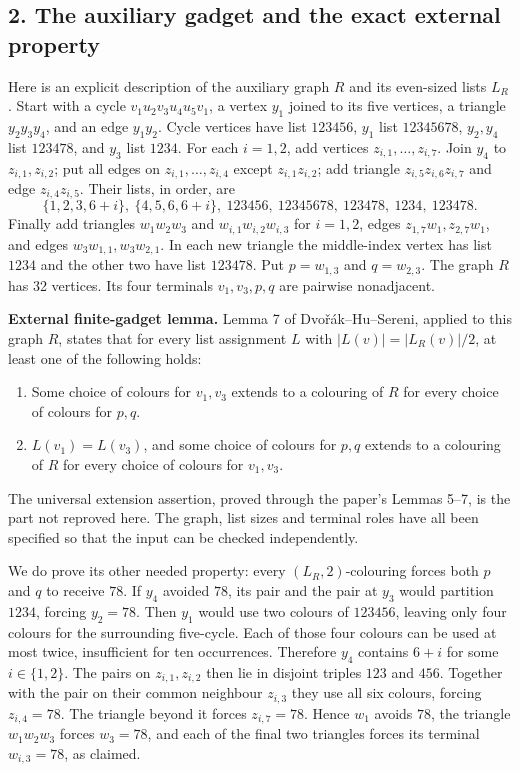 \subsection*{2. The auxiliary gadget and the exact external property}
Here is an explicit description of the auxiliary graph $R$ and its even-sized lists $L_R$.
Start with a cycle $v_1u_2v_3u_4u_5v_1$, a vertex $y_1$ joined to its five vertices, a triangle $y_2y_3y_4$, and an edge $y_1y_2$. Cycle vertices have list $123456$, $y_1$ list $12345678$, $y_2,y_4$ list $123478$, and $y_3$ list $1234$.
For each $i=1,2$, add vertices $z_{i,1},\ldots,z_{i,7}$. Join $y_4$ to $z_{i,1},z_{i,2}$; put all edges on $z_{i,1},\ldots,z_{i,4}$ except $z_{i,1}z_{i,2}$; add triangle $z_{i,5}z_{i,6}z_{i,7}$ and edge $z_{i,4}z_{i,5}$. Their lists, in order, are
\[
 \{1,2,3,6+i\},\ \{4,5,6,6+i\},\ 123456,\ 12345678,
 \ 123478,\ 1234,\ 123478.
\]
Finally add triangles $w_1w_2w_3$ and $w_{i,1}w_{i,2}w_{i,3}$ for $i=1,2$, edges $z_{1,7}w_1,z_{2,7}w_1$, and edges $w_3w_{1,1},w_3w_{2,1}$. In each new triangle the middle-index vertex has list $1234$ and the other two have list $123478$. Put $p=w_{1,3}$ and $q=w_{2,3}$. The graph $R$ has 32 vertices. Its four terminals $v_1,v_3,p,q$ are pairwise nonadjacent.

\textbf{External finite-gadget lemma.} Lemma 7 of Dvo\v r\'ak--Hu--Sereni, applied to this graph $R$, states that for every list assignment $L$ with $|L(v)|=|L_R(v)|/2$, at least one of the following holds:
\begin{enumerate}
\item Some choice of colours for $v_1,v_3$ extends to a colouring of $R$ for every choice of colours for $p,q$.
\item $L(v_1)=L(v_3)$, and some choice of colours for $p,q$ extends to a colouring of $R$ for every choice of colours for $v_1,v_3$.
\end{enumerate}
The universal extension assertion, proved through the paper's Lemmas 5--7, is the part not reproved here. The graph, list sizes and terminal roles have all been specified so that the input can be checked independently.

We do prove its other needed property: every $(L_R,2)$-colouring forces both $p$ and $q$ to receive $78$. If $y_4$ avoided $78$, its pair and the pair at $y_3$ would partition $1234$, forcing $y_2=78$. Then $y_1$ would use two colours of $123456$, leaving only four colours for the surrounding five-cycle. Each of those four colours can be used at most twice, insufficient for ten occurrences. Therefore $y_4$ contains $6+i$ for some $i\in\{1,2\}$. The pairs on $z_{i,1},z_{i,2}$ then lie in disjoint triples $123$ and $456$. Together with the pair on their common neighbour $z_{i,3}$ they use all six colours, forcing $z_{i,4}=78$. The triangle beyond it forces $z_{i,7}=78$. Hence $w_1$ avoids $78$, the triangle $w_1w_2w_3$ forces $w_3=78$, and each of the final two triangles forces its terminal $w_{i,3}=78$, as claimed.

